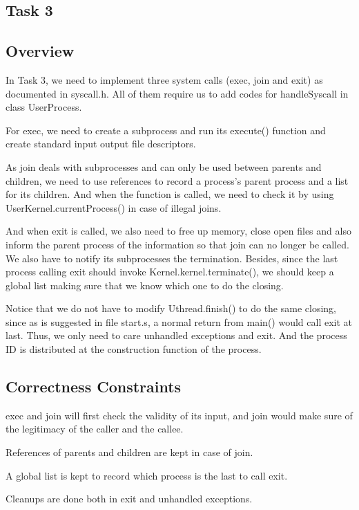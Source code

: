 \documentclass{article}
\begin{document}
\begin{spacing}{1.1}
\section{Task 3}
\subsection{Overview}
In Task 3, we need to implement three system calls (\textsf{exec, join} and \textsf{exit}) as documented in \textsf{syscall.h}. All of them require us to add codes for \textsf{handleSyscall} in class \textsf{UserProcess}.

For \textsf{exec}, we need to create a subprocess and run its \textsf{execute()} function and create standard input output file descriptors.

As \textsf{join} deals with subprocesses and can only be used between parents and children, we need to use references to record a process's parent process and a list for its children. And when the function is called, we need to check it by using \textsf{UserKernel.currentProcess()} in case of illegal joins.

And when \textsf{exit} is called, we also need to free up memory, close open files and also inform the parent process of the information so that \textsf{join} can no longer be called. We also have to notify its subprocesses the termination. Besides, since the last process calling \textsf{exit} should invoke \textsf{Kernel.kernel.terminate()}, we should keep a global list making sure that we know which one to do the closing.

Notice that we do not have to modify \textsf{Uthread.finish()} to do the same closing, since as is suggested in file \textsf{start.s}, a normal return from \textsf{main()} would call \textsf{exit} at last. Thus, we only need to care unhandled exceptions and \textsf{exit}. And the process ID is distributed at the construction function of the process.
\subsection{Correctness Constraints}
\begin{asparaitem}
  \item \textsf{exec} and \textsf{join} will first check the validity of its input, and \textsf{join} would make sure of the legitimacy of the caller and the callee.
  \item References of parents and children are kept in case of \textsf{join}.
  \item A global list is kept to record which process is the last to call \textsf{exit}.
  \item Cleanups are done both in \textsf{exit} and unhandled exceptions.
\end{asparaitem}

\end{spacing}
\end{document}
